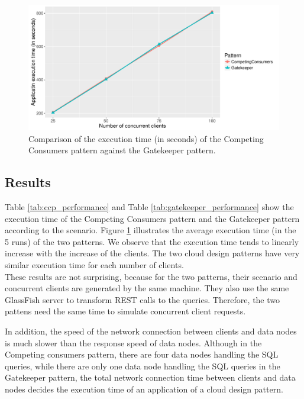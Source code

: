\documentclass{article}
\begin{document}
\begin{figure}[t]
    \centering
        \includegraphics[width = \columnwidth]{images/performance.pdf}
    \caption{Comparison of the execution time (in seconds) of the Competing Consumers pattern against the Gatekeeper pattern.}
    \label{fig:performance}
\end{figure}


\subsection{Results}
Table \ref{tab:ccp_performance} and Table \ref{tab:gatekeeper_performance} show the execution time of the Competing Consumers pattern and the Gatekeeper pattern according to the scenario. Figure \ref{fig:performance} illustrates the average execution time (in the 5 runs) of the two patterns. We observe that the execution time tends to linearly increase with the increase of the clients. The two cloud design patterns have very similar execution time for each number of clients.\\

These results are not surprising, because for the two patterns, their scenario and concurrent clients are generated by the same machine. They also use the same GlassFish server to transform REST calls to the queries. Therefore, the two pattens need the same time to simulate concurrent client requests. 

In addition, the speed of the network connection between clients and data nodes is much slower than the response speed of data nodes.
Although in the Competing consumers pattern, there are four data nodes handling the SQL queries, while there are only one data node handling the SQL queries in the Gatekeeper pattern, the total network connection time between clients and data nodes decides the execution time of an application of a cloud design pattern.
\end{document}
